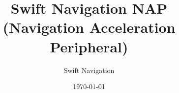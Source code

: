 \documentclass{article}
\title{Swift Navigation NAP\\(Navigation Acceleration Peripheral)}
\author{Swift Navigation}
\date{\today}
\begin{document}
\newcommand{\samplebits}{3}
\newcommand{\feclkfreq}{16.368}
\newcommand{\samplesperms}{16368}
\newcommand{\spiclkfreqs}{8.184, 16.368, 32.736, 49.104, 65.472, and 81.840 MHz}

\newcommand{\numtrackchans}{12}

\newcommand{\acqntaps}{16}
\newcommand{\acqfreqmult}{3}
\newcommand{\acqfreqmhz}{49.104}
\newcommand{\acqspeed}{80}
\newcommand{\acqlength}{49104}
\newcommand{\acqms}{3}

\newcommand{\cwfreqmult}{4}
\newcommand{\cwfreqmhz}{65.472}
\newcommand{\cwgranularityhz}{15}
\newcommand{\cwlength}{65472}
\newcommand{\cwms}{4}

\newcommand{\iirntaps}{5}
\newcommand{\iirfreqmhz}{81.840}
\newcommand{\iirnbits}{10}

\newcommand{\numcorrelators}{88}
\newcommand{\numgmaccs}{2.88}

\maketitle
\end{document}
